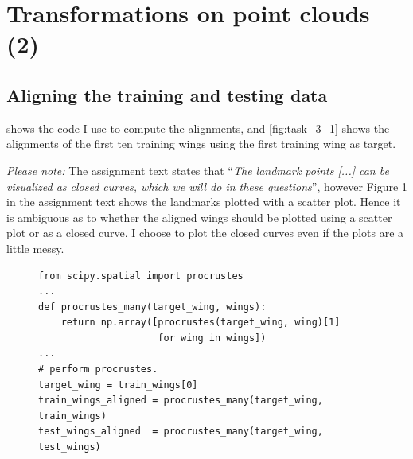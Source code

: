 \newpage
\section{Transformations on point clouds (2)}

\subsection{Aligning the training and testing data}

 shows the code I use to compute the alignments, and
\cref{fig:task_3_1} shows the alignments of the first ten training wings using
the first training wing as target.


\emph{Please note:} The assignment text states that ``\emph{The landmark points
[...] can be visualized as closed curves, which we will do in these
questions}'', however Figure 1 in the assignment text shows the landmarks
plotted with a scatter plot. Hence it is ambiguous as to whether the aligned
wings should be plotted using a scatter plot or as a closed curve. I choose to
plot the closed curves even if the plots are a little messy.

\begin{figure}[H]
  \centering
  \begin{verbatim}
from scipy.spatial import procrustes
...
def procrustes_many(target_wing, wings):
    return np.array([procrustes(target_wing, wing)[1]
                     for wing in wings])
...
# perform procrustes.
target_wing = train_wings[0]
train_wings_aligned = procrustes_many(target_wing, train_wings)
test_wings_aligned  = procrustes_many(target_wing, test_wings)
  \end{verbatim}
  \label{code:task_3_1}
\end{figure}

